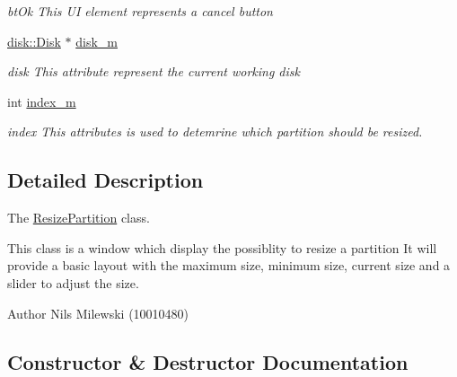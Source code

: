 \begin{DoxyCompactItemize}
\begin{DoxyCompactList}\small\item\em bt\+Ok This UI element represents a cancel button \end{DoxyCompactList}\item 
\mbox{\label{class_resize_partition_ac387fdd68a33f6ac0c620cf1afa459ef}} 
\mbox{\hyperlink{classdisk_1_1_disk}{disk\+::\+Disk}} $\ast$ \mbox{\hyperlink{class_resize_partition_ac387fdd68a33f6ac0c620cf1afa459ef}{disk\+\_\+m}}
\begin{DoxyCompactList}\small\item\em disk This attribute represent the current working disk \end{DoxyCompactList}\item 
\mbox{\label{class_resize_partition_a2811b0ed1fbf94ee4f80041e4b5d67bd}} 
int \mbox{\hyperlink{class_resize_partition_a2811b0ed1fbf94ee4f80041e4b5d67bd}{index\+\_\+m}}
\begin{DoxyCompactList}\small\item\em index This attributes is used to detemrine which partition should be resized. \end{DoxyCompactList}\end{DoxyCompactItemize}


\subsection{Detailed Description}
The \mbox{\hyperlink{class_resize_partition}{Resize\+Partition}} class. 

This class is a window which display the possiblity to resize a partition It will provide a basic layout with the maximum size, minimum size, current size and a slider to adjust the size. \begin{DoxyAuthor}{Author}
Nils Milewski (10010480) 
\end{DoxyAuthor}


\subsection{Constructor \& Destructor Documentation}
\mbox{\label{class_resize_partition_a05dfd7188a436d3bf6312a3335c9e4bd}} 

